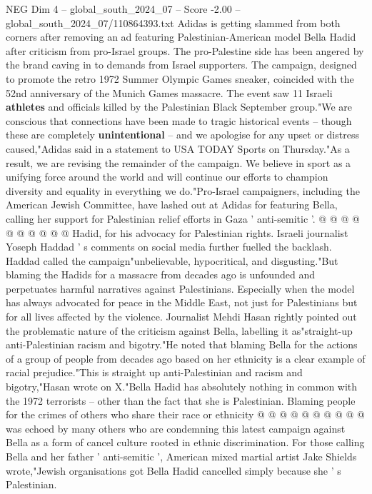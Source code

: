 \begin{textsample}{NEG Dim 4 – global\_south\_2024\_07 – Score -2.00 – global\_south\_2024\_07/110864393.txt}  \label{ex:f4_neg_341}
Adidas is getting slammed from both corners after removing an ad featuring Palestinian-American model Bella Hadid after criticism from pro-Israel groups.
The pro-Palestine side has been angered by the brand caving in to demands from Israel supporters.
The campaign, designed to promote the retro 1972 Summer Olympic Games sneaker, coincided with the 52nd anniversary of the Munich Games massacre.
The event saw 11 Israeli \textbf{athletes} and officials killed by the Palestinian Black September group."We are conscious that connections have been made to tragic historical events -- though these are completely \textbf{unintentional} -- and we apologise for any upset or distress caused,"Adidas said in a statement to USA TODAY Sports on Thursday."As a result, we are revising the remainder of the campaign.
We believe in sport as a unifying force around the world and will continue our efforts to champion diversity and equality in everything we do."Pro-Israel campaigners, including the American Jewish Committee, have lashed out at Adidas for featuring Bella, calling her support for Palestinian relief efforts in Gaza ' anti-semitic '. @ @ @ @ @ @ @ @ @ @ Hadid, for his advocacy for Palestinian rights.
Israeli journalist Yoseph Haddad ' s comments on social media further fuelled the backlash.
Haddad called the campaign"unbelievable, hypocritical, and disgusting."But blaming the Hadids for a massacre from decades ago is unfounded and perpetuates harmful narratives against Palestinians.
Especially when the model has always advocated for peace in the Middle East, not just for Palestinians but for all lives affected by the violence.
Journalist Mehdi Hasan rightly pointed out the problematic nature of the criticism against Bella, labelling it as"straight-up anti-Palestinian racism and bigotry."He noted that blaming Bella for the actions of a group of people from decades ago based on her ethnicity is a clear example of racial prejudice."This is straight up anti-Palestinian and racism and bigotry,"Hasan wrote on X."Bella Hadid has absolutely nothing in common with the 1972 terrorists -- other than the fact that she is Palestinian.
Blaming people for the crimes of others who share their race or ethnicity @ @ @ @ @ @ @ @ @ @ was echoed by many others who are condemning this latest campaign against Bella as a form of cancel culture rooted in ethnic discrimination.
For those calling Bella and her father ' anti-semitic ', American mixed martial artist Jake Shields wrote,"Jewish organisations got Bella Hadid cancelled simply because she ' s Palestinian.

\end{textsample}
